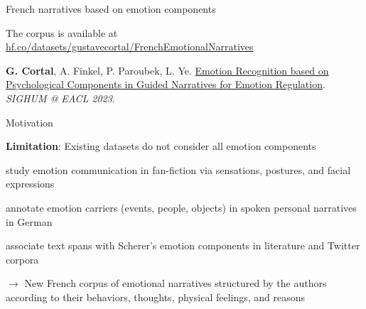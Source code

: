 \documentclass[handout,10pt]{beamer}
\newcommand{\smallcitep}[2][]{\text{\scriptsize \citep[#1]{#2}}} %
\begin{document}
\begin{frame}{}
\Large
\vfill
\begin{center}
    French narratives based on emotion components

    \vfill
\end{center}

\footnotesize{

The corpus is available at \href{https://huggingface.co/datasets/gustavecortal/FrenchEmotionalNarratives}{hf.co/datasets/gustavecortal/FrenchEmotionalNarratives}

\vspace{0.5cm}

\textbf{G. Cortal}, A. Finkel, P. Paroubek, L. Ye. \href{https://aclanthology.org/2023.latechclfl-1.8/}{Emotion Recognition based on Psychological Components in Guided Narratives for Emotion Regulation}. \textit{SIGHUM @ EACL 2023}.}%
\end{frame}

\begin{frame}{Motivation}

\textbf{Limitation}: Existing datasets do not consider all emotion components

\vspace{0.5cm}
\pause

\citet{kim-klinger-2019-analysis} study emotion communication in fan-fiction via sensations, postures, and facial expressions

\vspace{0.5cm}
\pause

\citet{tammewar-etal-2020-annotation} annotate emotion carriers (events, people, objects) in spoken personal narratives in German \smallcitep{rathner18b_interspeech}

\vspace{0.5cm}
\pause

\citet{casel-etal-2021-emotion} associate text spans with Scherer's emotion components in literature and Twitter corpora

\vspace{0.5cm}
\pause

$\rightarrow$ New French corpus of emotional narratives structured by the authors according to their behaviors, thoughts, physical feelings, and reasons
    
\end{frame}
\end{document}
